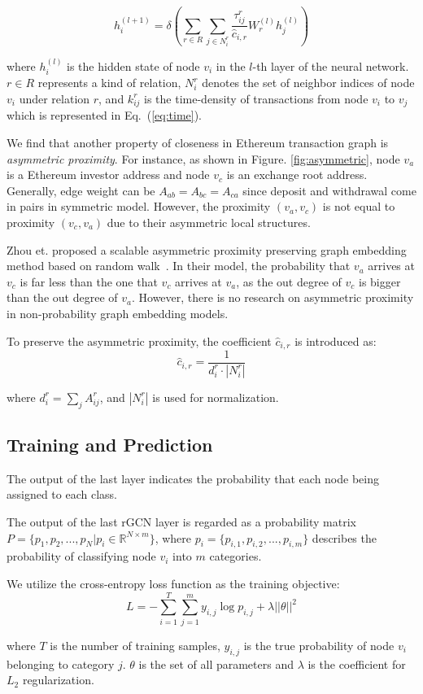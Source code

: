 \begin{equation}
h_i^{(l+1)}=\delta(\sum_{r\in R} \sum_{j \in N_i^r} \frac{\tau_{ij}^r}{\hat c_{i,r}}W_r^{(l)}h_j^{(l)})
\end{equation}

\noindent where $h_i^{(l)}$ is the hidden state of node $v_i$ in the $l$-th layer of the neural network. $r \in R$ represents a kind of relation, $N_i^r$ denotes the set of neighbor indices of node $v_i$ under relation $r$, and $k_{ij}^r$ is the time-density of transactions from node $v_i$ to $v_j$ which is represented in Eq.~(\ref{eq:time}).


We find that another property of closeness in Ethereum transaction graph is \emph{asymmetric proximity}. For instance, as shown in Figure. \ref{fig:asymmetric}, node $v_a$ is a Ethereum investor address and node $v_c$ is an exchange root address. Generally, edge weight can be $A_{ab}=A_{bc}=A_{ca}$ since deposit and withdrawal come in pairs in symmetric model. However, the proximity $(v_a,v_c)$ is not equal to proximity $(v_c,v_a)$ due to their asymmetric local structures.

 Zhou et. proposed a scalable asymmetric proximity preserving graph embedding method based on random walk~\cite{zhou2017scalable}. In their model, the probability that $v_a$ arrives at $v_c$ is far less than the one that $v_c$ arrives at $v_a$, as the out degree of $v_c$ is bigger than the out degree of $v_a$.
However, there is no research on asymmetric proximity in non-probability graph embedding models.

To preserve the asymmetric proximity, the coefficient $\hat c_{i,r}$ is introduced as:
\begin{equation}
\hat c_{i,r}=\frac{1}{d_i^r\cdot |N_i^r|}
\end{equation}

\noindent where $d_i^r=\sum_{j}A^r_{ij}$, and $|N_i^r|$ is used for normalization.



\subsection{Training and Prediction}
The output of the last layer indicates the probability that each node being assigned to each class.

The output of the last rGCN layer is regarded as a probability matrix $P=\{p_1,p_2,...,p_N|p_i\in \mathbb{R}^{N \times m}\}$, where $p_i=\{p_{i,1},p_{i,2},...,p_{i,m}\}$ describes the probability of classifying node $v_i$ into $m$ categories.

We utilize the cross-entropy loss function as the training objective:
\begin{equation}
L=-\sum_{i=1}^T\sum_{j=1}^m y_{i,j}\log p_{i,j}+\lambda ||\theta||^2
\end{equation}

\noindent where $T$ is the number of training samples, $y_{i,j}$ is the true probability of node $v_i$ belonging to category $j$. $\theta$ is the set of all parameters and $\lambda$ is the coefficient for $L_2$  regularization.
